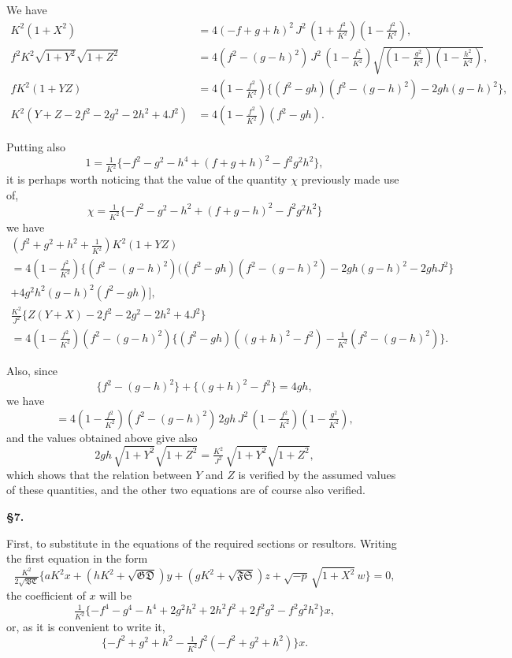 \documentclass[11pt]{article}
\begin{document}
\newpage
\setcounter{page}{78}

We have
\begin{align*}
K^2(1+X^2) &= 4(-f+g+h)^2\,J^2\,(1+\tfrac{f^2}{K^2})(1-\tfrac{f^2}{K^2}),\\
f^2K^2\sqrt{1+Y^2}\sqrt{1+Z^2} &= 4(f^2-(g-h)^2)\,J^2\,(1-\tfrac{f^2}{K^2})\sqrt{(1-\tfrac{g^2}{K^2})(1-\tfrac{h^2}{K^2})},\\
fK^2(1+YZ) &= 4(1-\tfrac{f^2}{K^2})\{(f^2-gh)(f^2-(g-h)^2)-2gh(g-h)^2\},\\
K^2(Y+Z-2f^2-2g^2-2h^2+4J^2) &= 4(1-\tfrac{f^2}{K^2})(f^2-gh).
\end{align*}

Putting also
\[
1 = \tfrac{1}{K^2}\{-f^2-g^2-h^4+(f+g+h)^2-f^2g^2h^2\},
\]
it is perhaps worth noticing that the value of the quantity $\chi$ previously made use of,
\[
\chi = \tfrac{1}{K^2}\{-f^2-g^2-h^2+(f+g-h)^2-f^2g^2h^2\}
\]
we have
\begin{multline*}
(f^2+g^2+h^2+\tfrac{1}{K^2})K^2(1+YZ)\\
= 4(1-\tfrac{f^2}{K^2})\{(f^2-(g-h)^2)((f^2-gh)(f^2-(g-h)^2)-2gh(g-h)^2-2ghJ^2\}\\
+ 4g^2h^2(g-h)^2(f^2-gh)\big],
\end{multline*}
\begin{multline*}
\tfrac{K^2}{J^2}\{Z(Y+X)-2f^2-2g^2-2h^2+4J^2\}\\
= 4(1-\tfrac{f^2}{K^2})(f^2-(g-h)^2)\{(f^2-gh)((g+h)^2-f^2)-\tfrac{1}{K^2}(f^2-(g-h)^2)\}.
\end{multline*}

Also, since
\[
\{f^2-(g-h)^2\} + \{(g+h)^2-f^2\} = 4gh,
\]
we have
\[
= 4(1-\tfrac{f^2}{K^2})(f^2-(g-h)^2)\,2gh\,J^2\,(1-\tfrac{f^2}{K^2})(1-\tfrac{g^2}{K^2}),
\]
and the values obtained above give also
\[
2gh\,\sqrt{1+Y^2}\sqrt{1+Z^2} = \tfrac{K^2}{J^2}\,\sqrt{1+Y^2}\sqrt{1+Z^2},
\]
which shows that the relation between $Y$ and $Z$ is verified by the assumed values of these quantities, and the other two equations are of course also verified.


\newpage
\setcounter{page}{79}

\noindent\textbf{\S 7.}

First, to substitute in the equations of the required sections or resultors. Writing the first equation in the form
\[
\tfrac{K^2}{2\sqrt{\mathfrak{B}\mathfrak{C}}}\{aK^2x + (hK^2+\sqrt{\mathfrak{G}\mathfrak{D}})y + (gK^2+\sqrt{\mathfrak{F}\mathfrak{S}})z + \sqrt{-p}\,\sqrt{1+X^2}\,w\} = 0,
\]
the coefficient of $x$ will be
\[
\tfrac{1}{K^2}\{-f^4-g^4-h^4+2g^2h^2+2h^2f^2+2f^2g^2-f^2g^2h^2\}x,
\]
or, as it is convenient to write it,
\[
\{-f^2+g^2+h^2-\tfrac{1}{K^2}f^2(-f^2+g^2+h^2)\}x.
\]
\end{document}
